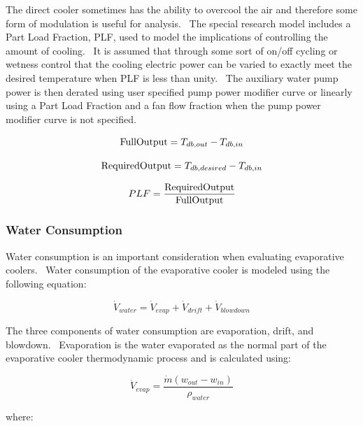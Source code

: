 The direct cooler sometimes has the ability to overcool the air and therefore some form of modulation is useful for analysis.~ The special research model includes a Part Load Fraction, PLF, used to model the implications of controlling the amount of cooling.~ It is assumed that through some sort of on/off cycling or wetness control that the cooling electric power can be varied to exactly meet the desired temperature when PLF is less than unity.~ The auxiliary water pump power is then derated using user specified pump power modifier curve or linearly using a Part Load Fraction and a fan flow fraction when the pump power modifier curve is not specified.

\begin{equation}
{\rm{FullOutput}} = {T_{db,out}} - {T_{db,in}}
\label{eq:IECFullOutput}
\end{equation}

\begin{equation}
{\rm{RequiredOutput}} = {T_{db,desired}} - {T_{db,in}}
\label{eq:IECRequiredOutput}
\end{equation}

\begin{equation}
PLF = \frac{{{\rm{RequiredOutput}}}}{{{\rm{FullOutput}}}}
\label{eq:IECPLF}
\end{equation}


\subsubsection{Water Consumption}\label{water-consumption-1}

Water consumption is an important consideration when evaluating evaporative coolers.~ Water consumption of the evaporative cooler is modeled using the following equation:

\begin{equation}
{\dot V_{water}} = {\dot V_{evap}} + {\dot V_{drift}} + {\dot V_{blowdown}}
\end{equation}

The three components of water consumption are evaporation, drift, and blowdown.~ Evaporation is the water evaporated as the normal part of the evaporative cooler thermodynamic process and is calculated using:

\begin{equation}
{\dot V_{evap}} = \frac{{\dot m\left( {{w_{out}} - {w_{in}}} \right)}}{{{\rho_{water}}}}
\end{equation}

where:

